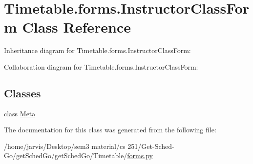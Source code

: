 \hypertarget{classTimetable_1_1forms_1_1InstructorClassForm}{}\section{Timetable.\+forms.\+Instructor\+Class\+Form Class Reference}
\label{classTimetable_1_1forms_1_1InstructorClassForm}


Inheritance diagram for Timetable.\+forms.\+Instructor\+Class\+Form\+:


Collaboration diagram for Timetable.\+forms.\+Instructor\+Class\+Form\+:
\subsection*{Classes}
\begin{DoxyCompactItemize}
\item 
class \hyperlink{classTimetable_1_1forms_1_1InstructorClassForm_1_1Meta}{Meta}
\end{DoxyCompactItemize}


The documentation for this class was generated from the following file\+:\begin{DoxyCompactItemize}
\item 
/home/jarvis/\+Desktop/sem3 material/cs 251/\+Get-\/\+Sched-\/\+Go/get\+Sched\+Go/get\+Sched\+Go/\+Timetable/\hyperlink{Timetable_2forms_8py}{forms.\+py}\end{DoxyCompactItemize}
